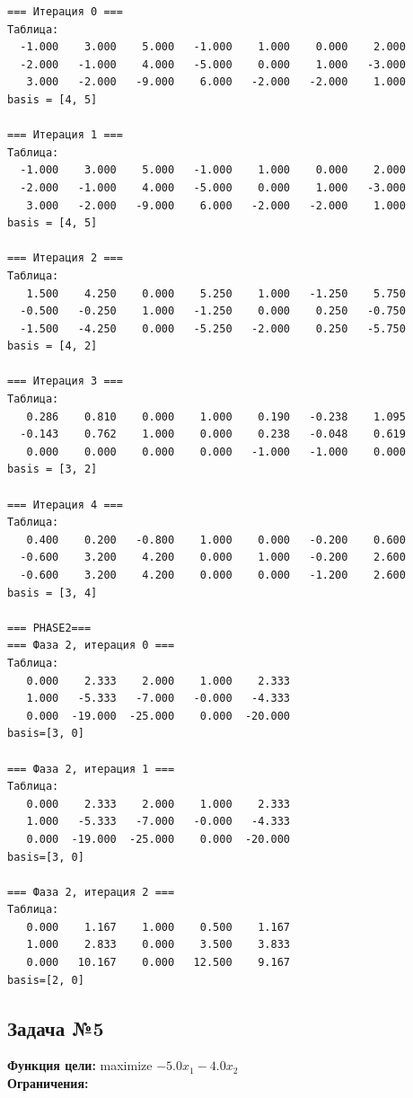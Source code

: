 \documentclass[a4paper,12pt]{article}
\begin{document}
\begin{verbatim}
=== Итерация 0 ===
Таблица:
  -1.000    3.000    5.000   -1.000    1.000    0.000    2.000
  -2.000   -1.000    4.000   -5.000    0.000    1.000   -3.000
   3.000   -2.000   -9.000    6.000   -2.000   -2.000    1.000
basis = [4, 5]

=== Итерация 1 ===
Таблица:
  -1.000    3.000    5.000   -1.000    1.000    0.000    2.000
  -2.000   -1.000    4.000   -5.000    0.000    1.000   -3.000
   3.000   -2.000   -9.000    6.000   -2.000   -2.000    1.000
basis = [4, 5]

=== Итерация 2 ===
Таблица:
   1.500    4.250    0.000    5.250    1.000   -1.250    5.750
  -0.500   -0.250    1.000   -1.250    0.000    0.250   -0.750
  -1.500   -4.250    0.000   -5.250   -2.000    0.250   -5.750
basis = [4, 2]

=== Итерация 3 ===
Таблица:
   0.286    0.810    0.000    1.000    0.190   -0.238    1.095
  -0.143    0.762    1.000    0.000    0.238   -0.048    0.619
   0.000    0.000    0.000    0.000   -1.000   -1.000    0.000
basis = [3, 2]

=== Итерация 4 ===
Таблица:
   0.400    0.200   -0.800    1.000    0.000   -0.200    0.600
  -0.600    3.200    4.200    0.000    1.000   -0.200    2.600
  -0.600    3.200    4.200    0.000    0.000   -1.200    2.600
basis = [3, 4]

=== PHASE2===
=== Фаза 2, итерация 0 ===
Таблица:
   0.000    2.333    2.000    1.000    2.333
   1.000   -5.333   -7.000   -0.000   -4.333
   0.000  -19.000  -25.000    0.000  -20.000
basis=[3, 0]

=== Фаза 2, итерация 1 ===
Таблица:
   0.000    2.333    2.000    1.000    2.333
   1.000   -5.333   -7.000   -0.000   -4.333
   0.000  -19.000  -25.000    0.000  -20.000
basis=[3, 0]

=== Фаза 2, итерация 2 ===
Таблица:
   0.000    1.167    1.000    0.500    1.167
   1.000    2.833    0.000    3.500    3.833
   0.000   10.167    0.000   12.500    9.167
basis=[2, 0]

\end{verbatim}



\subsection*{Задача №5}
\textbf{Функция цели: }
maximize $ -5.0x_{1} -4.0x_{2} $\\

\textbf{Ограничения:}
\end{document}

